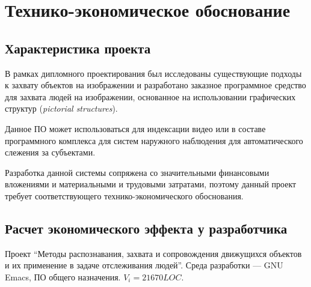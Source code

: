 \section{Технико-экономическое обоснование}

\subsection{Характеристика проекта}
В рамках дипломного проектирования был исследованы существующие подходы к захвату объектов на изображении и разработано заказное программное средство для захвата людей на изображении, основанное на использовании графических структур (\emph{pictorial structures}).

Данное ПО может использоваться для индексации видео или в составе программного комплекса для систем наружного наблюдения для автоматического слежения за субъектами.

Разработка данной системы сопряжена со значительными  финансовыми вложениями и материальными и трудовыми затратами, поэтому данный проект требует соответствующего технико-экономического обоснования.

\subsection{Расчет экономического эффекта у разработчика}
Проект ``Методы распознавания, захвата и сопровождения движущихся объектов и их применение в задаче отслеживания людей''. Среда разработки --- GNU Emacs, ПО общего назначения. \( V_i = 21670 LOC \).

